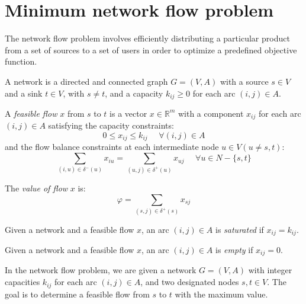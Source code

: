 \documentclass[12pt, a4paper]{report}
\begin{document}
    \section{Minimum network flow problem}
    The network flow problem involves efficiently distributing a particular product from a set of sources to a set of users in order to optimize a predefined objective function.
        \begin{definition}
        A network is a directed and connected graph $G = (V,A)$ with a source $s \in V$ and a sink $t \in V$, with $s \neq t$, and a capacity $k_{ij} \geq 0$ for each arc 
        $(i,j) \in A$. 

        A \emph{feasible flow} $x$ from $s$ to $t$ is a vector $x \in \mathbb{R}^m$ with a component $x_{ij}$ for each arc $(i,j) \in A$ satisfying the capacity constraints:
        \[0 \leq x_{ij} \leq k_{ij} \:\:\:\:\:\: \forall (i,j) \in A\]
        and the flow balance constraints at each intermediate node $u \in V (u \neq s,t)$: 
        \[\sum_{(i,u)\in \delta^{-}(u)}x_{iu}=\sum_{(u,j)\in \delta^{+}(u)}x_{uj} \:\:\:\:\:\: \forall u \in N-\{s,t\}\]

        The \emph{value of flow} $x$ is:
        \[\varphi = \sum_{(s,j) \in \delta^{+}(s)} x_{sj}\]

        Given a network and a feasible flow $x$, an arc $(i,j) \in A$ is \emph{saturated} if $x_{ij} = k_{ij}$. 

        Given a network and a feasible flow $x$, an arc $(i,j) \in A$ is \emph{empty} if $x_{ij} = 0$. 
    \end{definition}
    In the network flow problem, we are given a network $G = (V,A)$ with integer capacities $k_{ij}$ for each arc $(i,j) \in A$, and two designated nodes $s,t \in V$. 
    The goal is to determine a feasible flow from $s$ to $t$ with the maximum value.
\end{document}
